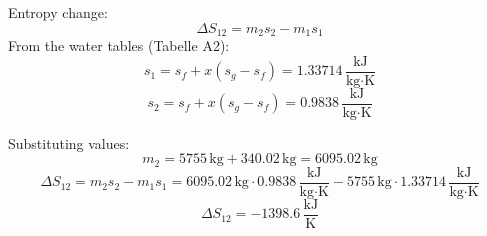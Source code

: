 Entropy change:  
\[
\Delta S_{12} = m_2 s_2 - m_1 s_1
\]  
From the water tables (Tabelle A2):  
\[
s_1 = s_f + x(s_g - s_f) = 1.33714 \, \frac{\text{kJ}}{\text{kg·K}}
\]  
\[
s_2 = s_f + x(s_g - s_f) = 0.9838 \, \frac{\text{kJ}}{\text{kg·K}}
\]  

Substituting values:  
\[
m_2 = 5755 \, \text{kg} + 340.02 \, \text{kg} = 6095.02 \, \text{kg}
\]  
\[
\Delta S_{12} = m_2 s_2 - m_1 s_1 = 6095.02 \, \text{kg} \cdot 0.9838 \, \frac{\text{kJ}}{\text{kg·K}} - 5755 \, \text{kg} \cdot 1.33714 \, \frac{\text{kJ}}{\text{kg·K}}
\]  
\[
\Delta S_{12} = -1398.6 \, \frac{\text{kJ}}{\text{K}}
\]